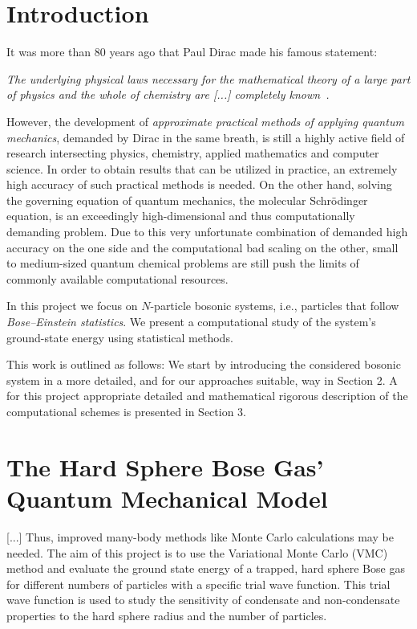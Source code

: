 \documentclass[11pt,a4paper]{article}
\numberwithin{equation}{section}
\begin{document}
\pagebreak
\tableofcontents
\listoffigures
\listoftables
\thispagestyle{empty} 

\pagebreak
\setcounter{page}{1}
\section{Introduction}
%
%
It was more than 80 years ago that Paul Dirac made his famous statement:

{\it The underlying physical laws necessary for the mathematical theory of a large part of physics and the whole of chemistry are [...] completely known~\cite{dirac1929quantum}.} 

However, the development of {\it approximate practical methods of applying quantum mechanics}, demanded by Dirac in the same breath, is still a highly active field of research intersecting physics, chemistry, applied mathematics and computer science. 
%
In order to obtain results that can be utilized in practice, an extremely high accuracy of such practical methods is needed.
%
On the other hand, solving the governing equation of quantum mechanics, the molecular Schr\"odinger equation, is an exceedingly high-dimensional and thus computationally demanding problem.
%
Due to this very unfortunate combination of demanded high accuracy on the one side and the computational bad scaling on the other, small to medium-sized quantum chemical problems are still push the limits of commonly available computational resources.

%
In this project we focus on $N$-particle bosonic systems, i.e., particles that follow {\it Bose--Einstein statistics}.
%
We present a computational study of the system's ground-state energy using statistical methods. 

%
This work is outlined as follows:
%
We start by introducing the considered bosonic system in a more detailed, and for our approaches suitable, way in Section 2. 
%
A for this project appropriate detailed and mathematical rigorous description of the computational schemes is presented in Section 3.  

\section{The Hard Sphere Bose Gas' Quantum Mechanical Model}
[...]
Thus, improved many-body methods like Monte Carlo calculations may be needed.  
%
The aim of this project is to use the Variational Monte Carlo (VMC) method and evaluate the ground state energy of a trapped, hard
sphere Bose gas for different numbers of particles with a specific trial wave function.
%
This trial wave function is used to study the sensitivity of condensate and non-condensate properties to the hard sphere radius and the number of particles.  
%
\end{document}
